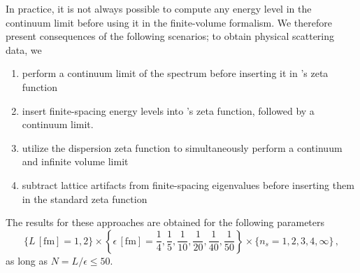 In practice, it is not always possible to compute any energy level in the continuum limit before using it in the finite-volume \Luscher formalism.
We therefore present consequences of the following scenarios; to obtain physical scattering data, we
\begin{enumerate}
	\item perform a continuum limit of the spectrum before inserting it in \Luscher's zeta function
	\item insert finite-spacing energy levels into \Luscher's zeta function, followed by a continuum limit.
	\item utilize the dispersion zeta function to simultaneously perform a continuum and infinite volume limit
	\item subtract lattice artifacts from finite-spacing eigenvalues before inserting them in the standard zeta function
\end{enumerate}
The results for these approaches are obtained for the following parameters
\begin{equation}
    \{ L \,[\mathrm{fm}]= 1, 2 \}
    \times \left\{ \epsilon \,[\mathrm{fm}] = \frac{1}{4}, \frac{1}{5}, \frac{1}{10}, \frac{1}{20}, \frac{1}{40}, \frac{1}{50} \right\}
    \times \{ n_s = 1, 2, 3, 4, \infty \}
    \, ,
\end{equation}
as long as $N = L / \epsilon \leq 50$.





